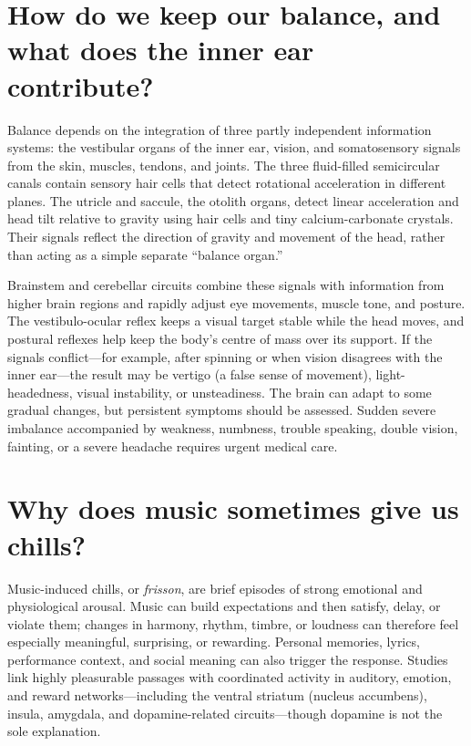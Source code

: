 \documentclass[11pt,oneside]{report}
\begin{document}
\section{How do we keep our balance, and what does the inner ear contribute?}

Balance depends on the integration of three partly independent information
systems: the vestibular organs of the inner ear, vision, and somatosensory
signals from the skin, muscles, tendons, and joints. The three fluid-filled
semicircular canals contain sensory hair cells that detect rotational
acceleration in different planes. The utricle and saccule, the otolith organs,
detect linear acceleration and head tilt relative to gravity using hair cells
and tiny calcium-carbonate crystals. Their signals reflect the direction of
gravity and movement of the head, rather than acting as a simple separate
``balance organ.''

Brainstem and cerebellar circuits combine these signals with information from
higher brain regions and rapidly adjust eye movements, muscle tone, and posture.
The vestibulo-ocular reflex keeps a visual target stable while the head moves,
and postural reflexes help keep the body's centre of mass over its support. If
the signals conflict---for example, after spinning or when vision disagrees
with the inner ear---the result may be vertigo (a false sense of movement),
light-headedness, visual instability, or unsteadiness. The brain can adapt to
some gradual changes, but persistent symptoms should be assessed. Sudden severe
imbalance accompanied by weakness, numbness, trouble speaking, double vision,
fainting, or a severe headache requires urgent medical care.

\section{Why does music sometimes give us chills?}

Music-induced chills, or \emph{frisson}, are brief episodes of strong emotional
and physiological arousal. Music can build expectations and then satisfy,
delay, or violate them; changes in harmony, rhythm, timbre, or loudness can
therefore feel especially meaningful, surprising, or rewarding. Personal
memories, lyrics, performance context, and social meaning can also trigger the
response. Studies link
highly pleasurable passages with coordinated activity in auditory, emotion,
and reward networks—including the ventral striatum (nucleus accumbens), insula,
amygdala, and dopamine-related circuits—though dopamine is not
the sole explanation.
\end{document}
